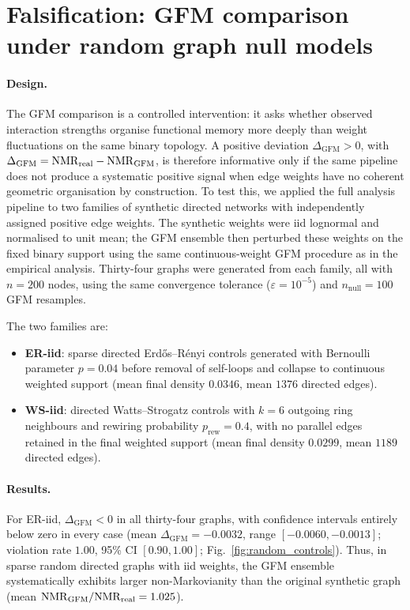 \documentclass[aps,superscriptaddress,11pt]{revtex4-2}
\theoremstyle{definition}
\theoremstyle{plain}
\begin{document}
\section{Falsification: GFM comparison under random graph null models}
\label{sec:random_controls}
\paragraph{Design.}
The GFM comparison is a controlled intervention: it asks whether observed
interaction strengths organise functional memory more deeply than weight
fluctuations on the same binary topology. A positive deviation
$\Delta_{\mathrm{GFM}}>0$, with
$\Delta_{\mathrm{GFM}}={\rm NMR}_{\rm real}-{\rm NMR}_{\rm GFM}$,
is therefore informative only if the same pipeline does not produce a
systematic positive signal when edge weights have no coherent geometric
organisation by construction. To test this, we applied the full analysis
pipeline to two families of synthetic directed networks with independently
assigned positive edge weights. The synthetic weights were iid lognormal
and normalised to unit mean; the GFM ensemble then perturbed these weights
on the fixed binary support using the same continuous-weight GFM procedure
as in the empirical analysis. Thirty-four graphs were generated from each
family, all with $n=200$ nodes, using the same convergence tolerance
($\varepsilon=10^{-5}$) and $n_{\mathrm{null}}=100$ GFM resamples.

The two families are:
\begin{itemize}
\item \textbf{ER-iid}: sparse directed Erdős--Rényi controls generated with
Bernoulli parameter $p=0.04$ before removal of self-loops and collapse to
continuous weighted support (mean final density $0.0346$, mean $1376$
directed edges).
\item \textbf{WS-iid}: directed Watts--Strogatz controls with $k=6$ outgoing
ring neighbours and rewiring probability $p_{\mathrm{rew}}=0.4$, with no
parallel edges retained in the final weighted support (mean final density
$0.0299$, mean $1189$ directed edges).
\end{itemize}

\paragraph{Results.}
For ER-iid, $\Delta_{\mathrm{GFM}}<0$ in all thirty-four graphs, with
confidence intervals entirely below zero in every case
(mean $\Delta_{\mathrm{GFM}}=-0.0032$, range
$[-0.0060,-0.0013]$; violation rate $1.00$, 95\% CI
$[0.90,1.00]$; Fig.~\ref{fig:random_controls}). Thus, in sparse random
directed graphs with iid weights, the GFM ensemble systematically exhibits
larger non-Markovianity than the original synthetic graph
(mean ${\rm NMR}_{\rm GFM}/{\rm NMR}_{\rm real}=1.025$).
\end{document}
